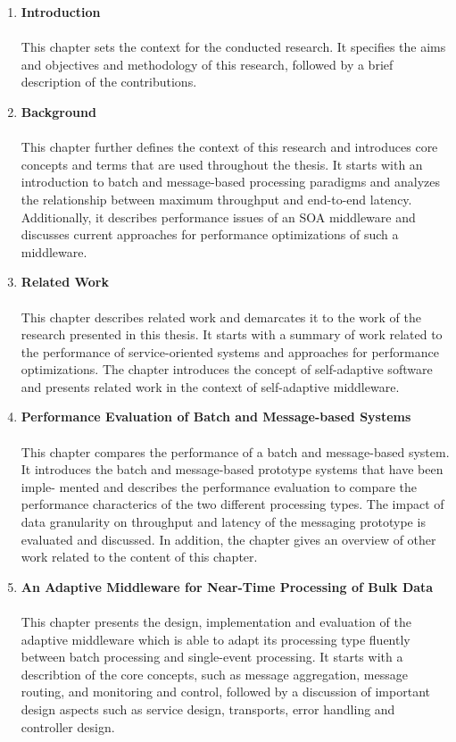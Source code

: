 \begin{enumerate}
	\item \textbf{Introduction}\\\\
	This chapter sets the context for the conducted research. It specifies the aims and objectives and methodology of this research, followed by a brief description of the contributions. 
	\item \textbf{Background}\\\\
	This chapter further defines the context of this research and introduces core concepts and terms that are used throughout the thesis. It starts with an introduction to batch and message-based processing paradigms and analyzes the relationship between maximum throughput and end-to-end latency. Additionally, it describes performance issues of an \ac{SOA} middleware and discusses current approaches for performance optimizations of such a middleware.
	\item \textbf{Related Work}\\\\
	This chapter describes related work and demarcates it to the work of the research presented in this thesis. It starts with a summary of work related to the performance of service-oriented systems and approaches for performance optimizations. The chapter introduces the concept of self-adaptive software and presents related work in the context of self-adaptive middleware.
	\item \textbf{Performance Evaluation of Batch and Message-based Systems}\\\\
	This chapter compares the performance of a batch and message-based system. It introduces the batch and message-based prototype systems that have been imple- mented and describes the performance evaluation to compare the performance characterics of the two different processing types.  The impact of data granularity on throughput and latency of the messaging prototype is evaluated and discussed. In addition, the chapter gives an overview of other work related to the content of this chapter.
	\item \textbf{An Adaptive Middleware for Near-Time Processing of Bulk Data}\\\\
	This chapter presents the design, implementation and evaluation of the adaptive middleware which is able to adapt its processing type fluently between batch processing and single-event processing. It starts with a describtion of the core concepts, such as message aggregation, message routing, and monitoring and control, followed by a discussion of important design aspects such as service design, transports, error handling and controller design.

\end{enumerate}
